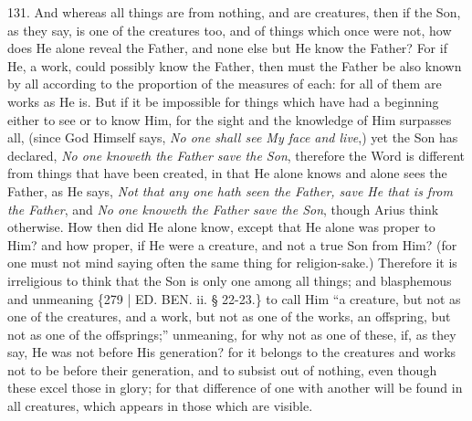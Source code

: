 131. And whereas all things
are from nothing, and are creatures, then if the Son, as they say, is
one of the creatures too, and of things which once were not, how does
He alone reveal the Father, and none else but He know the Father? For
if He, a work, could possibly know the Father, then must the Father be
also known by all according to the proportion of the measures of each:
for all of them are works as He is. But if it be impossible for things
which have had a beginning either to see or to know Him, for the sight
and the knowledge of Him surpasses all, (since God Himself says, \emph{No
one shall see My face and live},) yet the Son has declared, \emph{No
one knoweth the Father save the Son}, therefore the Word is
different from things that have been created, in that He alone knows
and alone sees the Father, as He says, \emph{Not that any one hath seen
the Father, save He that is from the Father}, and \emph{No one knoweth
the Father save the Son}, though Arius think otherwise. How then
did He alone know, except that He alone was proper to Him? and how
proper, if He were a creature, and not a true Son from Him? (for one
must not mind saying often the same thing for religion-sake.)
Therefore it is irreligious to think that the Son is only one among
all things; and blasphemous and unmeaning \{279 | ED. BEN.
ii. § 22-23.\} to call Him ``a creature, but not as one of the
creatures, and a work, but not as one of the works, an offspring, but
not as one of the offsprings;'' unmeaning, for why not as one of these,
if, as they say, He was not before His generation? for it belongs to
the creatures and works not to be before their generation, and to
subsist out of nothing, even though these excel those in glory; for
that difference of one with another will be found in all creatures,
which appears in those which are visible.

